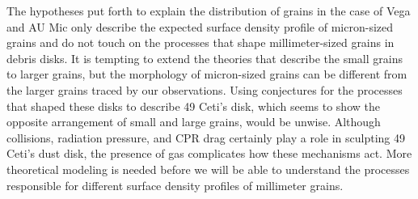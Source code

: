 The hypotheses put forth to explain the distribution of grains in the case of Vega and AU Mic only describe the expected surface density profile of micron-sized grains and do not touch on the processes that shape millimeter-sized grains in debris disks. It is tempting to extend the theories that describe the small grains to larger grains, but the morphology of micron-sized grains can be different from the larger grains traced by our observations. Using conjectures for the processes that shaped these disks to describe 49 Ceti's disk, which seems to show the opposite arrangement of small and large grains, would be unwise. Although collisions, radiation pressure, and CPR drag certainly play a role in sculpting 49 Ceti's dust disk, the presence of gas complicates how these mechanisms act. More theoretical modeling is needed before we will be able to understand the processes responsible for different surface density profiles of millimeter grains.  















